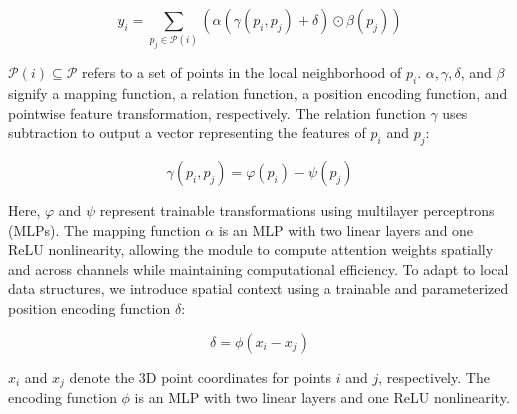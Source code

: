 \begin{equation}
y_{i} = \sum_{p_{j} \in \mathcal{P}(i)} (\alpha(\gamma(p_{i},p_{j}) + \delta) \odot \beta(p_{j}))
\end{equation}

\noindent $\mathcal{P}(i) \subseteq \mathcal{P}$ refers to a set of points in the local neighborhood of $p_{i}$. $\alpha, \gamma, \delta$, and $\beta$ signify a mapping function, a relation function, a position encoding function, and pointwise feature transformation, respectively. The relation function $\gamma$ uses subtraction to output a vector representing the features of $p_i$ and $p_j$:

\begin{equation}
\gamma(p_{i},p_{j}) = \varphi(p_i) - \psi(p_j) 
\end{equation}

\noindent Here, $\varphi$ and $\psi$ represent trainable transformations using multilayer perceptrons (MLPs). The mapping function $\alpha$ is an MLP with two linear layers and one ReLU nonlinearity, allowing the module to compute attention weights spatially and across channels while maintaining computational efficiency. To adapt to local data structures, we introduce spatial context using a trainable and parameterized position encoding function $\delta$:

\begin{equation}
\delta = \phi(x_i - x_j)  
\end{equation}

\noindent $x_i$ and $x_j$ denote the 3D point coordinates for points $i$ and $j$, respectively. The encoding function $\phi$ is an MLP with two linear layers and one ReLU nonlinearity. \\


